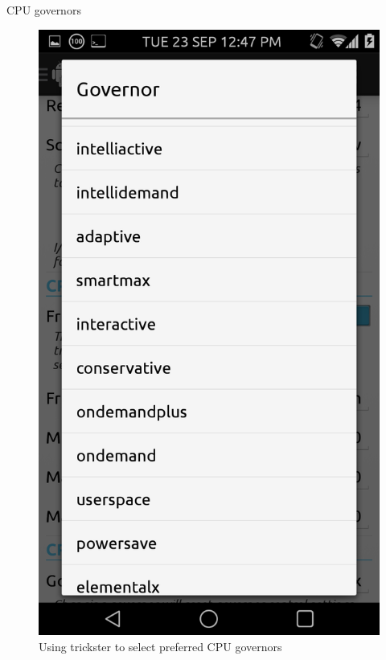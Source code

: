 \documentclass{beamer}
\begin{document}
\begin{frame}{CPU governors}
   \begin{figure}
   \includegraphics[scale=.1]{governor} 
   \caption {\tiny{Using trickster to select preferred CPU governors}}
   \end{figure}
     
    \end{frame}
    
\end{document}
